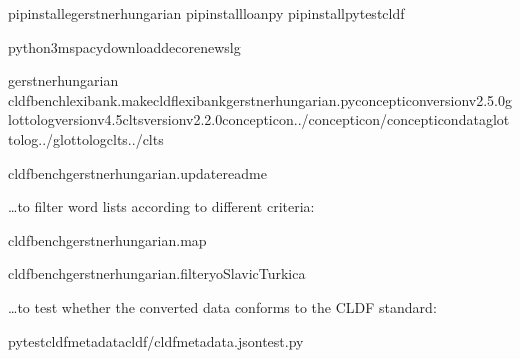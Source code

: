\documentclass[letterpaper,10pt,english]{sphinxmanual}
\begin{document}
{{{{\begin{sphinxVerbatim}[commandchars=\\\{\}]
pipinstall\PYGZhy{}egerstnerhungarian
pipinstallloanpy
pipinstallpytest\PYGZhy{}cldf

python3\PYGZhy{}mspacydownloadde\PYGZus{}core\PYGZus{}news\PYGZus{}lg

gerstnerhungarian
cldfbenchlexibank.makecldflexibank\PYGZus{}gerstnerhungarian.py\PYGZhy{}\PYGZhy{}concepticon\PYGZhy{}versionv2.5.0\PYGZhy{}\PYGZhy{}glottolog\PYGZhy{}versionv4.5\PYGZhy{}\PYGZhy{}clts\PYGZhy{}versionv2.2.0\PYGZhy{}\PYGZhy{}concepticon../concepticon/concepticon\PYGZhy{}data\PYGZhy{}\PYGZhy{}glottolog../glottolog\PYGZhy{}\PYGZhy{}clts../clts

cldfbenchgerstnerhungarian.update\PYGZus{}readme
\end{sphinxVerbatim}

\sphinxAtStartPar
…to filter word lists according to different criteria:

\begin{sphinxVerbatim}[commandchars=\\\{\}]
cldfbenchgerstnerhungarian.map

cldfbenchgerstnerhungarian.filter\PYGZhy{}y\PYGZhy{}oSlavicTurkic\PYGZhy{}a
\end{sphinxVerbatim}

\sphinxAtStartPar
…to test whether the converted data conforms to the CLDF standard:

\begin{sphinxVerbatim}[commandchars=\\\{\}]
pytest\PYGZhy{}\PYGZhy{}cldf\PYGZhy{}metadatacldf/cldf\PYGZhy{}metadata.jsontest.py
\end{sphinxVerbatim}

\sphinxstepscope


}}}}
\end{document}
